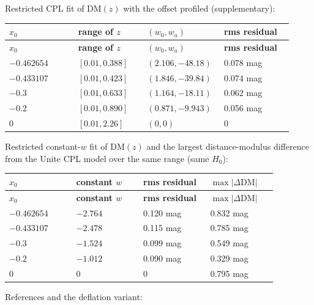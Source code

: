 \documentclass[11pt]{article}
\begin{document}
Restricted CPL fit of $\mathrm{DM}(z)$ with the offset profiled (supplementary):

\begin{longtable}{@{}p{0.230\linewidth}p{0.230\linewidth}p{0.230\linewidth}p{0.230\linewidth}@{}}
\toprule
\textbf{$x_0$} & \textbf{range of $z$} & \textbf{$(w_0,w_a)$} & \textbf{rms residual} \\
\midrule
\endfirsthead
\toprule
\textbf{$x_0$} & \textbf{range of $z$} & \textbf{$(w_0,w_a)$} & \textbf{rms residual} \\
\midrule
\endhead
$-0.462654$ & $[0.01,0.388]$ & $(2.106,-48.18)$ & 0.078 mag \\
$-0.433107$ & $[0.01,0.423]$ & $(1.846,-39.84)$ & 0.074 mag \\
$-0.3$ & $[0.01,0.633]$ & $(1.164,-18.11)$ & 0.062 mag \\
$-0.2$ & $[0.01,0.890]$ & $(0.871,-9.943)$ & 0.056 mag \\
0 & $[0.01,2.26]$ & $(0,0)$ & 0 \\
\bottomrule
\end{longtable}

Restricted constant-$w$ fit of $\mathrm{DM}(z)$ and the largest distance-modulus difference from the Unite CPL model over the same range (same $H_0$):

\begin{longtable}{@{}p{0.230\linewidth}p{0.230\linewidth}p{0.230\linewidth}p{0.230\linewidth}@{}}
\toprule
\textbf{$x_0$} & \textbf{constant $w$} & \textbf{rms residual} & \textbf{$\max\lvert\Delta\mathrm{DM}\rvert$} \\
\midrule
\endfirsthead
\toprule
\textbf{$x_0$} & \textbf{constant $w$} & \textbf{rms residual} & \textbf{$\max\lvert\Delta\mathrm{DM}\rvert$} \\
\midrule
\endhead
$-0.462654$ & $-2.764$ & 0.120 mag & 0.832 mag \\
$-0.433107$ & $-2.478$ & 0.115 mag & 0.785 mag \\
$-0.3$ & $-1.524$ & 0.099 mag & 0.549 mag \\
$-0.2$ & $-1.012$ & 0.090 mag & 0.329 mag \\
0 & 0 & 0 & 0.795 mag \\
\bottomrule
\end{longtable}

References and the deflation variant:
\end{document}
